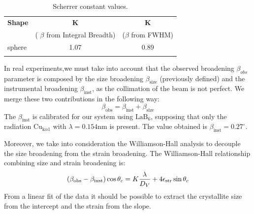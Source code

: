 \documentclass[prb,twocolumn]{revtex4-1}
\begin{document}
\begin{table}[H]
\centering
\begin{tabular*}{\columnwidth}{@{\extracolsep{\fill}}lcc}
\toprule
\textbf{Shape} & $\pmb{K}$  &  $\pmb{K}$  \\
	   & ( \(\beta\) from Integral Breadth) & (\(\beta\) from FWHM) \\
\colrule
sphere & 1.07 & 0.89 \\	   
\botrule
\end{tabular*}
\caption{Scherrer constant values.}
\label{tab:K_values}
\end{table}

\noindent In real experiments,we must take into account that the observed broadening \(\beta_{obs}\) parameter is composed by the size broadening \(\beta_{\text{size}}\) (previously defined) and the instrumental broadening \(\beta_{\text{inst}}\), as the collimation of the beam is not perfect.
We merge these two contributions in the following way: 
\begin{equation}
\beta_{\text{obs}} =\beta_{\text{inst}} + \beta_{\text{size}}
\end{equation}
The \( \beta_{\text{inst}}\)  is calibrated for our system using \(\text{LaB}_6\), supposing that only the radiation \(\text{Cu}_{ \text{k} \alpha 1 } \) with \(\lambda=0.154 \text{nm} \) is present. The value obtained is \(\beta_{\text{inst}}=0.27^\circ\).

Moreover, we take into consideration the Williamson-Hall analysis to decouple the size broadening from the strain broadening. The Williamson-Hall relationship combining size and strain broadening is:
\begin{equation}
    \qty(\beta_{\text{obs}} - \beta_{\text{inst}}) \cos \theta_c = K \frac{\lambda}{D_V} + 4 \epsilon_{\text{str}} \sin \theta_c 
\end{equation}
From a linear fit of the data it should be possible to extract the crystallite size from the intercept and the strain from the slope. 



\end{document}
